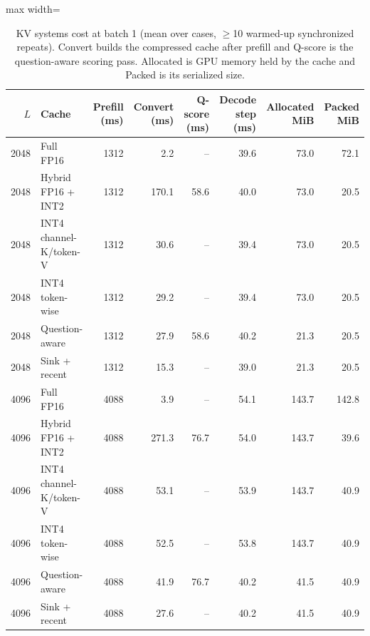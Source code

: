 \begin{table}[!htb]
\centering
\scriptsize
\setlength{\tabcolsep}{3.5pt}
\caption{KV systems cost at batch 1 (mean over cases, $\geq$10 warmed-up synchronized repeats). Convert builds the compressed cache after prefill and Q-score is the question-aware scoring pass. Allocated is GPU memory held by the cache and Packed is its serialized size.}
\label{tab:t2csys}
\begin{adjustbox}{max width=\linewidth}
\begin{tabular}{rlrrrrrr}
\toprule
$L$ & Cache & Prefill (ms) & Convert (ms) & Q-score (ms) & Decode step (ms) & Allocated MiB & Packed MiB \\
\midrule
2048 & Full FP16 & 1312 & 2.2 & -- & 39.6 & 73.0 & 72.1 \\
2048 & Hybrid FP16 + INT2 & 1312 & 170.1 & 58.6 & 40.0 & 73.0 & 20.5 \\
2048 & INT4 channel-K/token-V & 1312 & 30.6 & -- & 39.4 & 73.0 & 20.5 \\
2048 & INT4 token-wise & 1312 & 29.2 & -- & 39.4 & 73.0 & 20.5 \\
2048 & Question-aware & 1312 & 27.9 & 58.6 & 40.2 & 21.3 & 20.5 \\
2048 & Sink + recent & 1312 & 15.3 & -- & 39.0 & 21.3 & 20.5 \\
4096 & Full FP16 & 4088 & 3.9 & -- & 54.1 & 143.7 & 142.8 \\
4096 & Hybrid FP16 + INT2 & 4088 & 271.3 & 76.7 & 54.0 & 143.7 & 39.6 \\
4096 & INT4 channel-K/token-V & 4088 & 53.1 & -- & 53.9 & 143.7 & 40.9 \\
4096 & INT4 token-wise & 4088 & 52.5 & -- & 53.8 & 143.7 & 40.9 \\
4096 & Question-aware & 4088 & 41.9 & 76.7 & 40.2 & 41.5 & 40.9 \\
4096 & Sink + recent & 4088 & 27.6 & -- & 40.2 & 41.5 & 40.9 \\
\bottomrule
\end{tabular}
\end{adjustbox}
\end{table}
